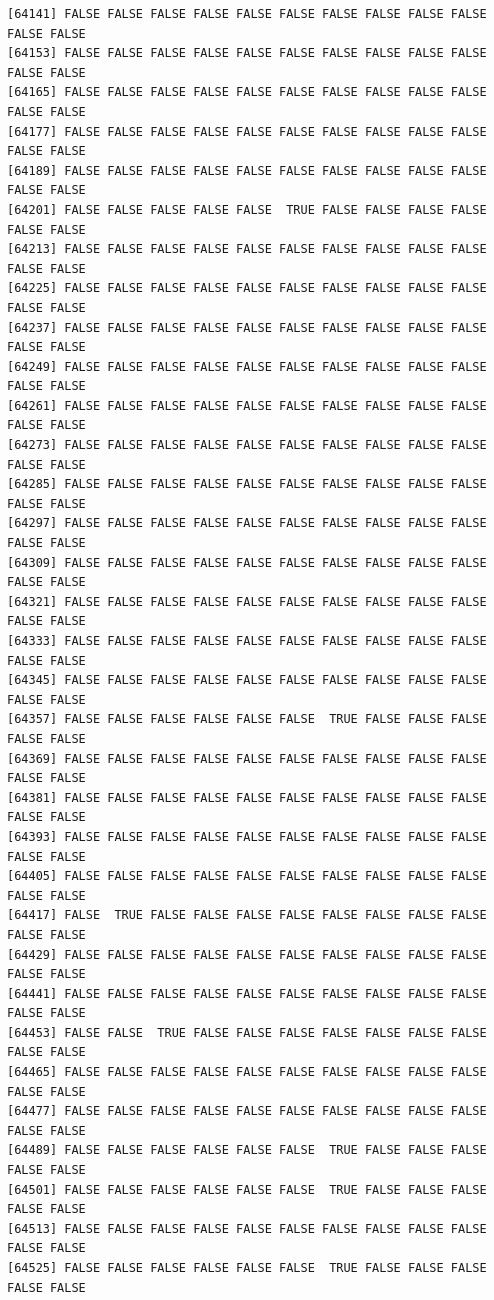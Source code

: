\documentclass[
  a4paper,
  DIV=11,
  numbers=noendperiod]{scrartcl}
\begin{document}
\begin{verbatim}
[64141] FALSE FALSE FALSE FALSE FALSE FALSE FALSE FALSE FALSE FALSE FALSE FALSE
[64153] FALSE FALSE FALSE FALSE FALSE FALSE FALSE FALSE FALSE FALSE FALSE FALSE
[64165] FALSE FALSE FALSE FALSE FALSE FALSE FALSE FALSE FALSE FALSE FALSE FALSE
[64177] FALSE FALSE FALSE FALSE FALSE FALSE FALSE FALSE FALSE FALSE FALSE FALSE
[64189] FALSE FALSE FALSE FALSE FALSE FALSE FALSE FALSE FALSE FALSE FALSE FALSE
[64201] FALSE FALSE FALSE FALSE FALSE  TRUE FALSE FALSE FALSE FALSE FALSE FALSE
[64213] FALSE FALSE FALSE FALSE FALSE FALSE FALSE FALSE FALSE FALSE FALSE FALSE
[64225] FALSE FALSE FALSE FALSE FALSE FALSE FALSE FALSE FALSE FALSE FALSE FALSE
[64237] FALSE FALSE FALSE FALSE FALSE FALSE FALSE FALSE FALSE FALSE FALSE FALSE
[64249] FALSE FALSE FALSE FALSE FALSE FALSE FALSE FALSE FALSE FALSE FALSE FALSE
[64261] FALSE FALSE FALSE FALSE FALSE FALSE FALSE FALSE FALSE FALSE FALSE FALSE
[64273] FALSE FALSE FALSE FALSE FALSE FALSE FALSE FALSE FALSE FALSE FALSE FALSE
[64285] FALSE FALSE FALSE FALSE FALSE FALSE FALSE FALSE FALSE FALSE FALSE FALSE
[64297] FALSE FALSE FALSE FALSE FALSE FALSE FALSE FALSE FALSE FALSE FALSE FALSE
[64309] FALSE FALSE FALSE FALSE FALSE FALSE FALSE FALSE FALSE FALSE FALSE FALSE
[64321] FALSE FALSE FALSE FALSE FALSE FALSE FALSE FALSE FALSE FALSE FALSE FALSE
[64333] FALSE FALSE FALSE FALSE FALSE FALSE FALSE FALSE FALSE FALSE FALSE FALSE
[64345] FALSE FALSE FALSE FALSE FALSE FALSE FALSE FALSE FALSE FALSE FALSE FALSE
[64357] FALSE FALSE FALSE FALSE FALSE FALSE  TRUE FALSE FALSE FALSE FALSE FALSE
[64369] FALSE FALSE FALSE FALSE FALSE FALSE FALSE FALSE FALSE FALSE FALSE FALSE
[64381] FALSE FALSE FALSE FALSE FALSE FALSE FALSE FALSE FALSE FALSE FALSE FALSE
[64393] FALSE FALSE FALSE FALSE FALSE FALSE FALSE FALSE FALSE FALSE FALSE FALSE
[64405] FALSE FALSE FALSE FALSE FALSE FALSE FALSE FALSE FALSE FALSE FALSE FALSE
[64417] FALSE  TRUE FALSE FALSE FALSE FALSE FALSE FALSE FALSE FALSE FALSE FALSE
[64429] FALSE FALSE FALSE FALSE FALSE FALSE FALSE FALSE FALSE FALSE FALSE FALSE
[64441] FALSE FALSE FALSE FALSE FALSE FALSE FALSE FALSE FALSE FALSE FALSE FALSE
[64453] FALSE FALSE  TRUE FALSE FALSE FALSE FALSE FALSE FALSE FALSE FALSE FALSE
[64465] FALSE FALSE FALSE FALSE FALSE FALSE FALSE FALSE FALSE FALSE FALSE FALSE
[64477] FALSE FALSE FALSE FALSE FALSE FALSE FALSE FALSE FALSE FALSE FALSE FALSE
[64489] FALSE FALSE FALSE FALSE FALSE FALSE  TRUE FALSE FALSE FALSE FALSE FALSE
[64501] FALSE FALSE FALSE FALSE FALSE FALSE  TRUE FALSE FALSE FALSE FALSE FALSE
[64513] FALSE FALSE FALSE FALSE FALSE FALSE FALSE FALSE FALSE FALSE FALSE FALSE
[64525] FALSE FALSE FALSE FALSE FALSE FALSE  TRUE FALSE FALSE FALSE FALSE FALSE

\end{verbatim}
\end{document}
